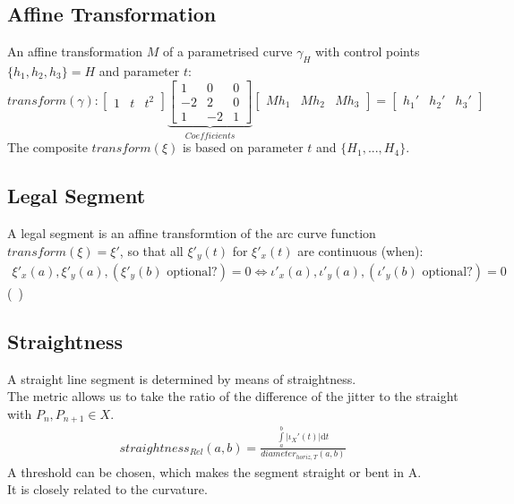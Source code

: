 \documentclass{report}
\begin{document}
\subsection{Affine Transformation}
An affine transformation $M$ of a parametrised curve $\gamma_{H}$ with control points $\{h_{1},h_{2},h_{3}\} = H$ and parameter $t$:
\begin{equation}
transform(\gamma):
\begin{bmatrix}
1 & t & t^2
\end{bmatrix}
\underbrace{\begin{bmatrix}
1 & 0 & 0\\
-2 & 2 & 0\\
1 & -2 &1
\end{bmatrix}}_{Coefficients}
\begin{bmatrix}
Mh_{1} & Mh_{2} & Mh_{3}
\end{bmatrix}
=
\begin{bmatrix}
h_{1}' & h_{2}' & h_{3}'
\end{bmatrix}
\end{equation}
The composite $transform(\xi)$ is based on parameter $t$ and $\{H_{1}, ... ,H_{4}\}$.

\subsection{Legal Segment}
A legal segment is an affine transformtion of the arc curve function $transform(\xi) = \xi'$, so that all $\xi'_{y}(t)$ for $\xi'_{x}(t)$ are continuous (when):
\begin{align}
\xi'_{x}(a),\xi'_{y}(a), (\xi'_{y}(b)\text{ optional?}) = 0 \Leftrightarrow \iota'_{x}(a),\iota'_{y}(a), (\iota'_{y}(b)\text{ optional?}) = 0
\end{align}
(~\cite[\nopp Riemann Integrable?]{Widon})

\subsection{Straightness}
A straight line segment is determined by means of straightness.\\
The metric allows us to take the ratio of the difference of the jitter to the straight with $P_{n},P_{n+1} \in X$. \\
\begin{align}
straightness_{Rel}(a,b)=\frac{\int \limits _{a}^{b} \lvert \iota_{X}'(t) \rvert \mathrm{d}t}{diameter_{horiz,T}(a,b)}
\end{align}
A threshold can be chosen, which makes the segment straight or bent in A.\\
It is closely related to the curvature.
\end{document}
